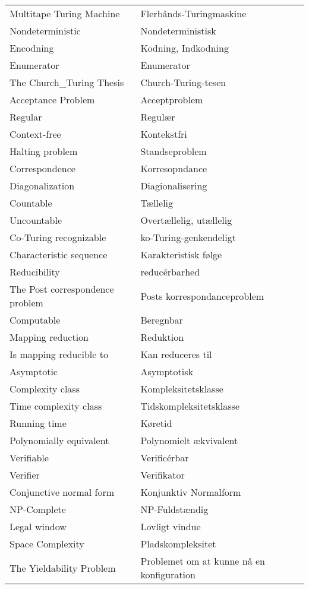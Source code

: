 \begin{longtable}[c]{ll}
  Multitape Turing Machine & Flerbånds-Turingmaskine \\
  Nondeterministic & Nondeterministisk \\
  Encodning & Kodning, Indkodning \\
  Enumerator & Enumerator \\
  The Church_Turing Thesis & Church-Turing-tesen \\
  Acceptance Problem & Acceptproblem \\
  Regular & Regulær \\
  Context-free & Kontekstfri\\
  Halting problem & Standseproblem \\
  Correspondence & Korresopndance \\
  Diagonalization & Diagionalisering \\
  Countable & Tællelig \\
  Uncountable & Overtællelig, utællelig \\
  Co-Turing recognizable & ko-Turing-genkendeligt \\
  Characteristic sequence & Karakteristisk følge \\
  Reducibility & reducérbarhed \\
  The Post correspondence problem & Posts korrespondanceproblem \\
  Computable & Beregnbar \\
  Mapping reduction & Reduktion \\
  Is mapping reducible to & Kan reduceres til \\
  Asymptotic & Asymptotisk \\
  Complexity class & Kompleksitetsklasse \\
  Time complexity class & Tidskompleksitetsklasse \\
  Running time & Køretid \\
  Polynomially equivalent & Polynomielt ækvivalent \\
  Verifiable & Verificérbar \\
  Verifier & Verifikator \\
  Conjunctive normal form & Konjunktiv Normalform \\
  NP-Complete & NP-Fuldstændig \\
  Legal window & Lovligt vindue \\
  Space Complexity & Pladskompleksitet \\
  The Yieldability Problem & Problemet om at kunne nå en konfiguration
\end{longtable}

